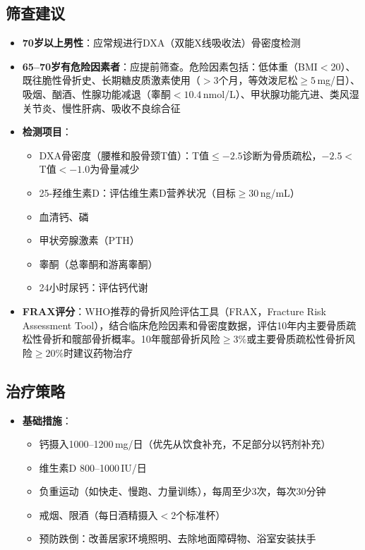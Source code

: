\begin{enumerate}
\subsection{筛查建议}

\begin{itemize}[leftmargin=2cm]
	\item \textbf{70岁以上男性}：应常规进行DXA（双能X线吸收法）骨密度检测
	\item \textbf{65--70岁有危险因素者}：应提前筛查。危险因素包括：低体重（BMI$<$20）、既往脆性骨折史、长期糖皮质激素使用（$>3$个月，等效泼尼松$\geq 5\,$mg/日）、吸烟、酗酒、性腺功能减退（睾酮$<10.4\,$nmol/L）、甲状腺功能亢进、类风湿关节炎、慢性肝病、吸收不良综合征
	\item \textbf{检测项目}：
	\begin{itemize}
		\item DXA骨密度（腰椎和股骨颈T值）：T值$\leq -2.5$诊断为骨质疏松，$-2.5 < $T值$< -1.0$为骨量减少
		\item 25-羟维生素D：评估维生素D营养状况（目标$\geq 30\,$ng/mL）
		\item 血清钙、磷
		\item 甲状旁腺激素（PTH）
		\item 睾酮（总睾酮和游离睾酮）
		\item 24小时尿钙：评估钙代谢
	\end{itemize}
	\item \textbf{FRAX评分}：WHO推荐的骨折风险评估工具（FRAX，Fracture Risk Assessment Tool），结合临床危险因素和骨密度数据，评估10年内主要骨质疏松性骨折和髋部骨折概率。10年髋部骨折风险$\geq 3\%$或主要骨质疏松性骨折风险$\geq 20\%$时建议药物治疗
\end{itemize}

\subsection{治疗策略}

\begin{itemize}[leftmargin=2cm]
	\item \textbf{基础措施}：
	\begin{itemize}
		\item 钙摄入1000--1200\,mg/日（优先从饮食补充，不足部分以钙剂补充）
		\item 维生素D 800--1000\,IU/日
		\item 负重运动（如快走、慢跑、力量训练），每周至少3次，每次30分钟
		\item 戒烟、限酒（每日酒精摄入$<$2个标准杯）
		\item 预防跌倒：改善居家环境照明、去除地面障碍物、浴室安装扶手
	\end{itemize}


\end{itemize}
\end{enumerate}
